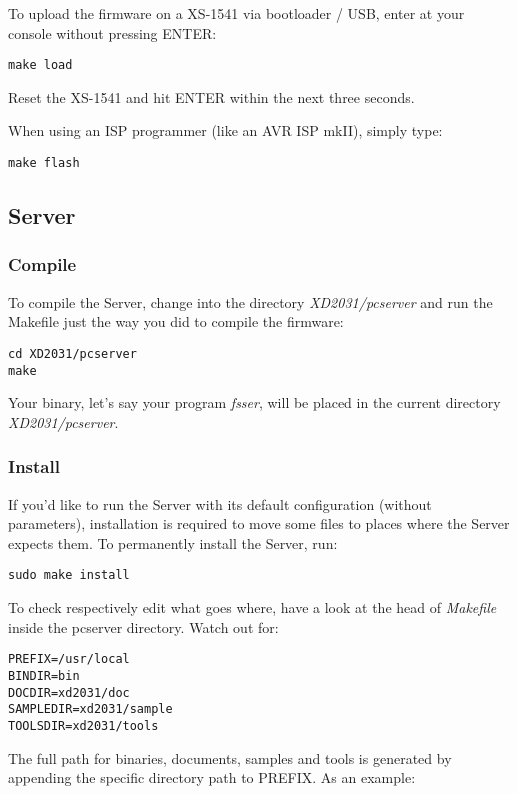To upload the firmware on a XS-1541 via bootloader / USB, enter at your
console without pressing ENTER:

\begin{verbatim}
make load
\end{verbatim}

Reset the XS-1541 and hit ENTER within the next three seconds.

When using an ISP programmer (like an AVR ISP mkII), simply type:

\begin{verbatim}
make flash
\end{verbatim}

\subsection{Server}
\subsubsection{Compile}
To compile the Server, change into the directory \textit{XD2031/pcserver}
and run the Makefile just the way you did to compile the firmware:

\begin{verbatim}
cd XD2031/pcserver
make
\end{verbatim}

Your binary, let's say your program \textit{fsser},  will be placed 
in the current directory \textit{XD2031/pcserver}.

\subsubsection{Install}
If you'd like to run the Server with its default configuration
(without parameters), installation is required to move
some files to places where the Server expects them. To permanently install
the Server, run:

\begin{verbatim}
sudo make install
\end{verbatim}

To check respectively edit what goes where, have a look at the head of \textit{Makefile}
inside the pcserver directory. Watch out for:

\begin{verbatim}
PREFIX=/usr/local
BINDIR=bin
DOCDIR=xd2031/doc
SAMPLEDIR=xd2031/sample
TOOLSDIR=xd2031/tools
\end{verbatim}

The full path for binaries, documents, samples and tools is generated by
appending the specific directory path to PREFIX. As an example:


